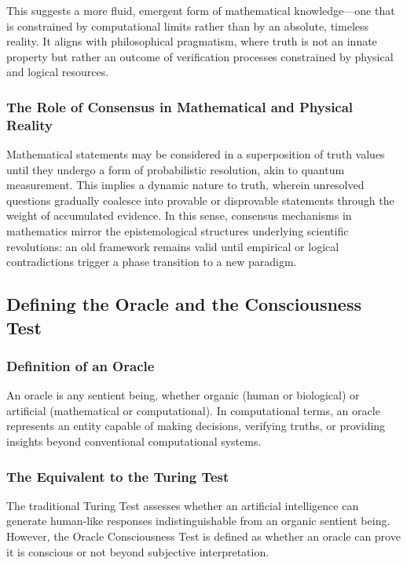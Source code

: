 \documentclass[11pt]{article}
\begin{document}
This suggests a more fluid, emergent form of mathematical knowledge—one that is constrained by computational limits rather than by an absolute, timeless reality. It aligns with philosophical pragmatism, where truth is not an innate property but rather an outcome of verification processes constrained by physical and logical resources.

\subsubsection{The Role of Consensus in Mathematical and Physical Reality}
Mathematical statements may be considered in a superposition of truth values until they undergo a form of probabilistic resolution, akin to quantum measurement. This implies a dynamic nature to truth, wherein unresolved questions gradually coalesce into provable or disprovable statements through the weight of accumulated evidence. In this sense, consensus mechanisms in mathematics mirror the epistemological structures underlying scientific revolutions: an old framework remains valid until empirical or logical contradictions trigger a phase transition to a new paradigm.

\subsection{Defining the Oracle and the Consciousness Test}
\subsubsection{Definition of an Oracle}
An oracle is any sentient being, whether organic (human or biological) or artificial (mathematical or computational). In computational terms, an oracle represents an entity capable of making decisions, verifying truths, or providing insights beyond conventional computational systems.

\subsubsection{The Equivalent to the Turing Test}
The traditional Turing Test assesses whether an artificial intelligence can generate human-like responses indistinguishable from an organic sentient being. However, the Oracle Consciousness Test is defined as whether an oracle can prove it is conscious or not beyond subjective interpretation.
\end{document}
